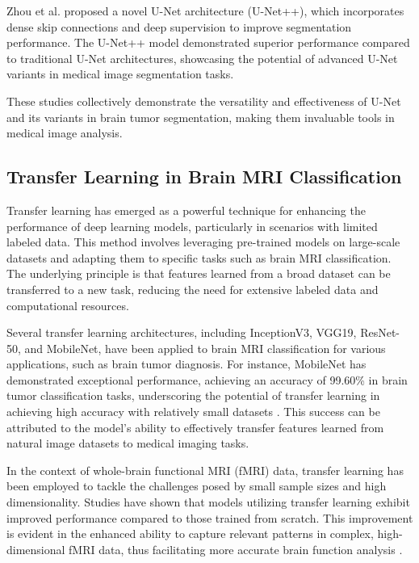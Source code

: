 Zhou et al. \cite{zhou2018unetplusplus} proposed a novel U-Net architecture (U-Net++), which incorporates dense skip connections and deep supervision to improve segmentation performance. The U-Net++ model demonstrated superior performance compared to traditional U-Net architectures, showcasing the potential of advanced U-Net variants in medical image segmentation tasks.

These studies collectively demonstrate the versatility and effectiveness of U-Net and its variants in brain tumor segmentation, making them invaluable tools in medical image analysis.

\subsection{Transfer Learning in Brain MRI Classification}

Transfer learning has emerged as a powerful technique for enhancing the performance of deep learning models, particularly in scenarios with limited labeled data. This method involves leveraging pre-trained models on large-scale datasets and adapting them to specific tasks such as brain MRI classification. The underlying principle is that features learned from a broad dataset can be transferred to a new task, reducing the need for extensive labeled data and computational resources.

Several transfer learning architectures, including InceptionV3, VGG19, ResNet-50, and MobileNet, have been applied to brain MRI classification for various applications, such as brain tumor diagnosis. For instance, MobileNet has demonstrated exceptional performance, achieving an accuracy of 99.60\% in brain tumor classification tasks, underscoring the potential of transfer learning in achieving high accuracy with relatively small datasets  \cite{Islam_Barua_Rahman_Ahammed_Akter_Uddin_2023}. This success can be attributed to the model's ability to effectively transfer features learned from natural image datasets to medical imaging tasks.

In the context of whole-brain functional MRI (fMRI) data, transfer learning has been employed to tackle the challenges posed by small sample sizes and high dimensionality. Studies have shown that models utilizing transfer learning exhibit improved performance compared to those trained from scratch. This improvement is evident in the enhanced ability to capture relevant patterns in complex, high-dimensional fMRI data, thus facilitating more accurate brain function analysis \cite{10.1007/978-3-030-32695-1_7}.


